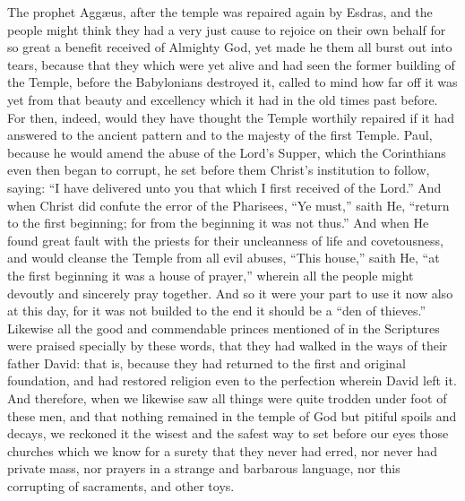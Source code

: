 The prophet Aggæus, after the temple was repaired
again by Esdras, and the people might think they had a very just cause
to rejoice on their own behalf for so great a benefit received of Almighty
God, yet made he them all burst out into tears, because that they which
were yet alive and had seen the former building of the Temple, before
the Babylonians destroyed it, called to mind how far off it was yet
from that beauty and excellency which it had in the old times past before.
For then, indeed, would they have thought the Temple worthily repaired
if it had answered to the ancient pattern and to the majesty of the
first Temple. Paul, because he would amend the abuse of the Lord’s
Supper, which the Corinthians even then began to corrupt, he set before
them Christ’s institution to follow, saying: “I have delivered
unto you that which I first received of the Lord.” And when
Christ did confute the error of the Pharisees, “Ye must,”
saith He, “return to the first beginning; for from the beginning
it was not thus.” And when He found great fault with the
priests for their uncleanness of life and covetousness, and would cleanse
the Temple from all evil abuses, “This house,” saith He,
“at the first beginning it was a house of prayer,” wherein
all the people might devoutly and sincerely pray together. And
so it were
your part to use it now also at this day, for it was not builded to
the end it should be a “den of thieves.” Likewise
all the good and commendable princes mentioned of in the Scriptures
were praised specially by these words, that they had walked in the ways
of their father David: that is, because they had returned to the first
and original foundation, and had restored religion even to the perfection
wherein David left it. And therefore, when we likewise saw all
things were quite trodden under foot of these men, and that nothing
remained in the temple of God but pitiful spoils and decays, we reckoned
it the wisest and the safest way to set before our eyes those churches
which we know for a surety that they never had erred, nor never had
private mass, nor prayers in a strange and barbarous language, nor this
corrupting of sacraments, and other toys.

